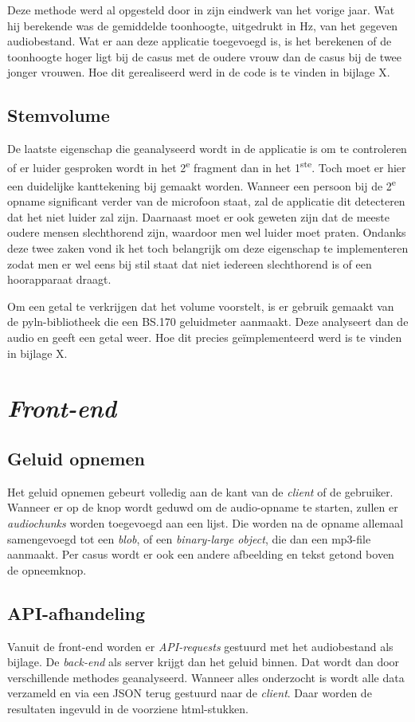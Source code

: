 Deze methode werd al opgesteld door \textcite{Standaert2021} in zijn eindwerk van het vorige jaar. Wat hij berekende was de gemiddelde toonhoogte, uitgedrukt in Hz, van het gegeven audiobestand. Wat er aan deze applicatie toegevoegd is, is het berekenen of de toonhoogte hoger ligt bij de casus met de oudere vrouw dan de casus bij de twee jonger vrouwen.
Hoe dit gerealiseerd werd in de code is te vinden in bijlage X.

\subsection{Stemvolume}
De laatste eigenschap die geanalyseerd wordt in de applicatie is om te controleren of er luider gesproken wordt in het 2\textsuperscript{e} fragment dan in het 1\textsuperscript{ste}. Toch moet er hier een duidelijke kanttekening bij gemaakt worden. Wanneer een persoon bij de 2\textsuperscript{e} opname significant verder van de microfoon staat, zal de applicatie dit detecteren dat het niet luider zal zijn. Daarnaast moet er ook geweten zijn dat de meeste oudere mensen slechthorend zijn, waardoor men wel luider moet praten. Ondanks deze twee zaken vond ik het toch belangrijk om deze eigenschap te implementeren zodat men er wel eens bij stil staat dat niet iedereen slechthorend is of een hoorapparaat draagt.

Om een getal te verkrijgen dat het volume voorstelt, is er gebruik gemaakt van de pyln-bibliotheek die een BS.170 geluidmeter aanmaakt. Deze analyseert dan de audio en geeft een getal weer. Hoe dit precies geïmplementeerd werd is te vinden in bijlage X.

\section{\textit{Front-end}}
\subsection{Geluid opnemen}
Het geluid opnemen gebeurt volledig aan de kant van de \textit{client} of de gebruiker. Wanneer er op de knop wordt geduwd om de audio-opname te starten, zullen er \textit{audiochunks } worden toegevoegd aan een lijst. Die worden na de opname allemaal samengevoegd tot een \textit{blob}, of een \textit{binary-large object}, die dan een mp3-file aanmaakt.
Per casus wordt er ook een andere afbeelding en tekst getond boven de opneemknop.

\subsection{API-afhandeling}
Vanuit de front-end worden er \textit{API-requests} gestuurd met het audiobestand als bijlage. De \textit{back-end} als server krijgt dan het geluid binnen. Dat wordt dan door verschillende methodes geanalyseerd. Wanneer alles onderzocht is wordt alle data verzameld en via een JSON terug gestuurd naar de \textit{client}. Daar worden de resultaten ingevuld in de voorziene html-stukken.

